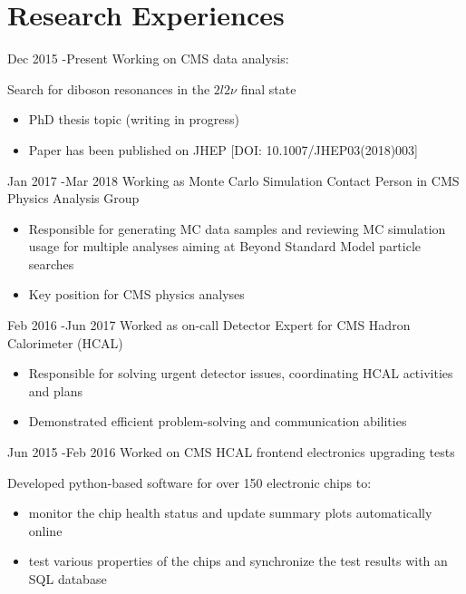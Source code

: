 \documentclass[14pt]{article} %
\begin{document}
\section{Research Experiences}
\job
{Dec 2015 -}{Present}
{Working on CMS data analysis:}
{Search for diboson resonances in the $2l2\nu$ final state
\begin{itemize}
\item PhD thesis topic (writing in progress)
\item Paper has been published on JHEP [DOI: 10.1007/JHEP03(2018)003]%
\end{itemize}}
\job
{Jan 2017 -}{Mar 2018}
{Working as Monte Carlo Simulation Contact Person in CMS Physics Analysis Group}
{
\begin{itemize}
\item Responsible for generating MC data samples and reviewing MC simulation usage for multiple analyses aiming at Beyond Standard Model particle searches
\item Key position for CMS physics analyses
\end{itemize}}
\job
{Feb 2016 -}{Jun 2017}
{Worked as on-call Detector Expert for CMS Hadron Calorimeter (HCAL)}
{
\begin{itemize}
\item Responsible for solving urgent detector issues, coordinating HCAL activities and plans
\item Demonstrated efficient problem-solving and communication abilities
\end{itemize}}
\job
{Jun 2015 -}{Feb 2016}
{Worked on CMS HCAL frontend electronics upgrading tests}
{Developed python-based software for over 150 electronic chips to:
\begin{itemize}
\item monitor the chip health status and update summary plots automatically online
\item test various properties of the chips and synchronize the test results with an SQL database
\end{itemize}
}
\end{document}

